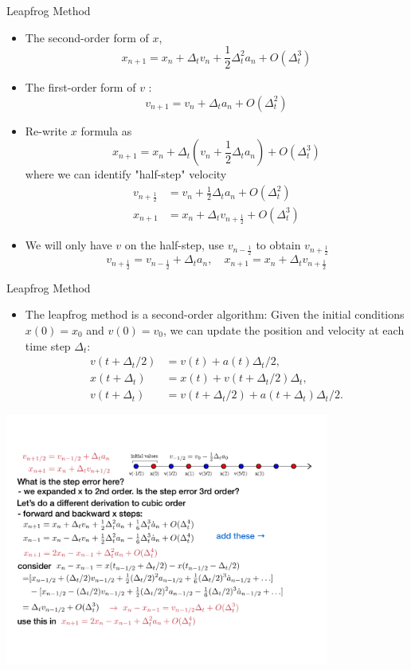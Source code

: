 \documentclass{beamer}
\begin{document}
\begin{frame}{Leapfrog Method}
  \begin{itemize}
    \item The second-order form of $x$,
    $$
    x_{n+1}=x_n+\Delta_t v_n+\frac{1}{2} \Delta_t^2 a_n+O\left(\Delta_t^3\right)
    $$
\item The first-order form of ${v}$ :
    $$
    v_{n+1}=v_n+\Delta_t a_n+O\left(\Delta_t^2\right)
    $$
\item
    Re-write $x$ formula as
    $$
    x_{n+1}=x_n+\Delta_t\left(v_n+\frac{1}{2} \Delta_t a_n\right)+O\left(\Delta_t^3\right)
    $$
    where we can identify "half-step" velocity 
    \begin{align*}
    v_{n+\frac{1}{2}}&=v_n+\frac{1}{2} \Delta_t a_n+O\left(\Delta_t^2\right)\\
    x_{n+1}&=x_n+\Delta_t v_{n+\frac{1}{2}}+O\left(\Delta_t^3\right)
    \end{align*}
    \item We will only have $v$ on the half-step, use $v_{n-\frac{1}{2}}$ to obtain $v_{n+\frac{1}{2}}$
   $$ 
      v_{n+\frac{1}{2}}  =v_{n-\frac{1}{2}}+\Delta_t a_n, \quad x_{n+1}  =x_n+\Delta_t v_{n+\frac{1}{2}}
   $$ 
  \end{itemize}
\end{frame}
\begin{frame}{Leapfrog Method}

  \begin{itemize}
    \item The leapfrog method is a second-order algorithm: 
    Given the initial conditions $x(0)=x_0$ and $v(0)=v_0$, we can update the position and velocity at each time step $\Delta_t$:
    \begin{align*}
      v(t+\Delta_t/2) &= v(t)+a(t)\Delta_t/2,\\
      x(t+\Delta_t) &= x(t)+v(t+\Delta_t/2)\Delta_t,\\
      v(t+\Delta_t) &= v(t+\Delta_t/2)+a(t+\Delta_t)\Delta_t/2.
    \end{align*}
  \end{itemize}
  \centerline{\includegraphics[width=0.8\textwidth]{./leapfrog.pdf}}
\end{frame}
\end{document}
